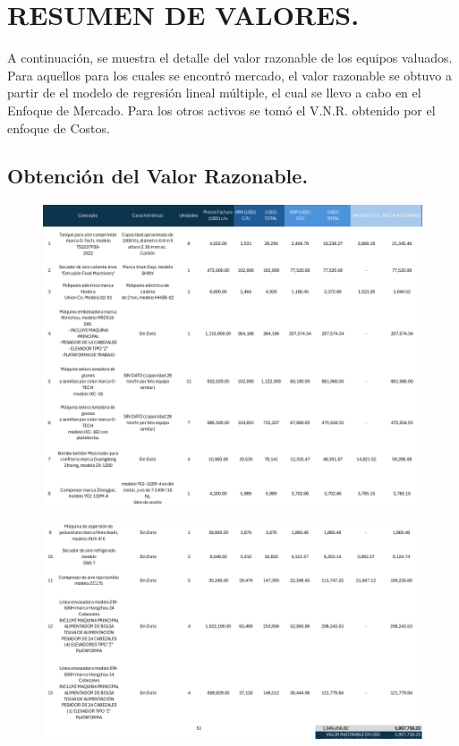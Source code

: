 
\chapter{RESUMEN DE VALORES.} %
A continuación, se muestra el detalle del valor razonable de los equipos valuados.
Para aquellos para los cuales se encontró mercado, el valor razonable se obtuvo a partir
de el modelo de regresión lineal múltiple, el cual se llevo a cabo en el Enfoque de Mercado.
Para los otros activos se tomó el V.N.R. obtenido por el enfoque de Costos.

\section{Obtención del Valor Razonable.} %
\begin{figure}[hbtp!]
	\centering
\includegraphics[width=  \linewidth, page = 1]{../0.imagenes/CAP_9/tabla_resumen_1}
\end{figure}
\newpage
\begin{figure}[hbtp!]
	\centering
\includegraphics[width=  \linewidth, page = 1]{../0.imagenes/CAP_9/tabla_resumen_2}
\end{figure}
\espacio


